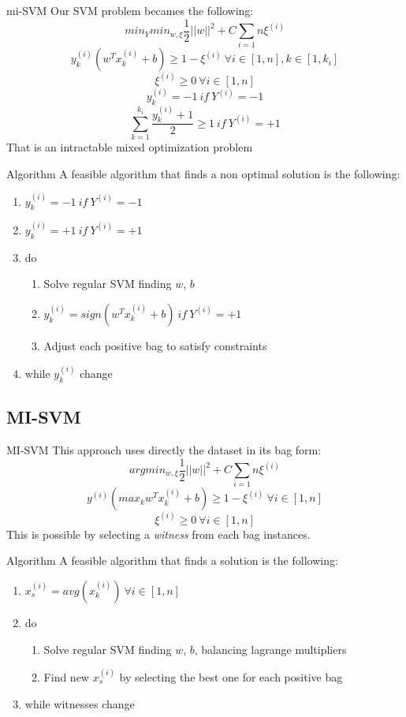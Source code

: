 \begin{frame}{mi-SVM}
	Our SVM problem becames the following:
	$$min_Y min_{w, \xi} \frac{1}{2} ||w||^2 + C \sum_{i = 1}{n}\xi^{(i)}$$
	$$y_k^{(i)} (w^T x_k^{(i)} + b) \geq 1 - \xi^{(i)} \ \forall i \in [1, n], k \in [1, k_i]$$
	$$\xi^{(i)} \geq 0 \ \forall i \in [1, n]$$
	$$y_k^{(i)} = -1 \ if \ Y^{(i)} = -1$$
	$$\sum_{k = 1}^{k_i}\frac{y_k^{(i)} + 1}{2} \geq 1 \ if \ Y^{(i)} = +1$$
	That is an intractable mixed optimization problem
\end{frame}

\begin{frame}{Algorithm}
	A feasible algorithm that finds a non optimal solution is the following:
	\begin{enumerate}
		\item $y_k^{(i)} = -1 \ if \ Y^{(i)} = -1$
		\item $y_k^{(i)} = +1 \ if \ Y^{(i)} = +1$
		\item do
		\begin{enumerate}
			\item Solve regular SVM finding $w$, $b$
			\item $y_k^{(i)} = sign(w^T x_k^{(i)} + b) \ if \ Y^{(i)} = +1$
			\item Adjust each positive bag to satisfy constraints
		\end{enumerate}
		\item while $y_k^{(i)}$ change
	\end{enumerate}
\end{frame}

\subsection{MI-SVM}
\begin{frame}{MI-SVM}
	This approach uses directly the dataset in its bag form:
	$$arg min_{w, \xi} \frac{1}{2} ||w||^2 + C \sum_{i = 1}{n}\xi^{(i)}$$
	$$y^{(i)} (max_k w^T x_k^{(i)} + b) \geq 1 - \xi^{(i)} \ \forall i \in [1, n]$$
	$$\xi^{(i)} \geq 0 \ \forall i \in [1, n]$$
	This is possible by selecting a \textit{witness} from each bag instances.
\end{frame}

\begin{frame}{Algorithm}
	A feasible algorithm that finds a solution is the following:
	\begin{enumerate}
		\item $x_s^{(i)} = avg(x_k^{(i)}) \ \forall i \in [1, n]$
		\item do
		\begin{enumerate}
			\item Solve regular SVM finding $w$, $b$, balancing lagrange multipliers
			\item Find new $x_s^{(i)}$ by selecting the best one for each positive bag
		\end{enumerate}
		\item while witnesses change
	\end{enumerate}
\end{frame}

